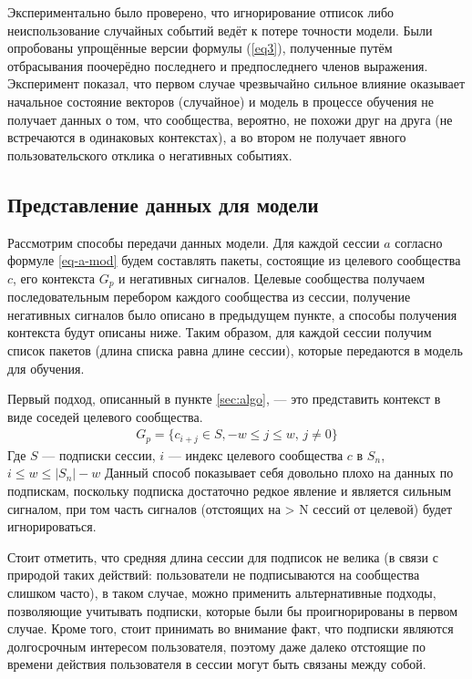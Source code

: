 \documentclass[times,specification,annotation]{itmo-student-thesis}
\begin{document}
Экспериментально было проверено, что игнорирование отписок либо неиспользование случайных событий ведёт к потере точности модели. Были опробованы упрощённые версии формулы (\ref{eq3}), полученные путём отбрасывания
поочерёдно последнего и предпоследнего членов выражения. Эксперимент показал, что первом случае чрезвычайно сильное
влияние оказывает начальное состояние векторов (случайное) и модель в процессе обучения не получает данных о том, что сообщества, вероятно,
не похожи друг на друга (не встречаются в одинаковых контекстах), а во втором не получает явного пользовательского отклика о негативных событиях. 

\subsection{Представление данных для модели}\label{sec:dataf}

Рассмотрим способы передачи данных модели. Для каждой сессии $a$ согласно формуле \ref{eq-a-mod} будем составлять пакеты, состоящие из целевого сообщества $c$, его контекста $G_p$ и негативных сигналов. Целевые сообщества получаем последовательным перебором каждого сообщества из сессии, получение негативных сигналов было описано в предыдущем пункте, а способы получения контекста будут описаны ниже. Таким образом, для каждой сессии получим список пакетов (длина списка равна длине сессии), которые передаются в модель для обучения.

Первый подход, описанный в пункте \ref{sec:algo}, --- это представить контекст в виде соседей целевого сообщества. 
\begin{align}
G_p =\{c_{i + j} \in S, -w \leq j \leq w,\, j \ne 0\} \label{eq4}
\end{align}
Где $S$ --- подписки сессии, $i$ --- индекс целевого сообщества $c$ в $S_n$, $i \leq w \leq |S_n| - w$
Данный способ показывает себя довольно плохо на данных по подпискам, поскольку подписка
достаточно редкое явление и является сильным сигналом, при том часть сигналов
(отстоящих на > N сессий от целевой) будет игнорироваться.

Стоит отметить, что средняя длина сессии для подписок не велика (в связи с природой таких действий: пользователи не подписываются на сообщества слишком часто), в таком случае, можно применить альтернативные подходы, позволяющие учитывать подписки, которые были бы проигнорированы в первом случае. Кроме того, стоит принимать во внимание факт, что подписки являются долгосрочным интересом пользователя, поэтому даже далеко отстоящие по времени действия пользователя в сессии могут быть связаны между собой.
\end{document}
